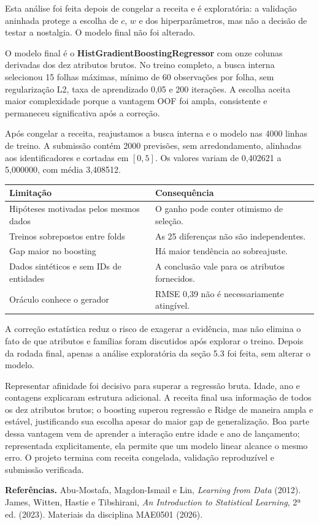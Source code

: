 \documentclass[10pt,a4paper]{article}
\newcommand{\secao}[1]{\vspace{5pt}\noindent{\large\bfseries #1}\par\vspace{2pt}}
\begin{document}
{\small Esta análise foi feita depois de congelar a receita e é exploratória: a validação aninhada protege a escolha de $c$, $w$ e dos hiperparâmetros, mas não a decisão de testar a nostalgia. O modelo final não foi alterado.}

\secao{6. Modelo final e submissão}
O modelo final é o \textbf{HistGradientBoostingRegressor} com onze colunas derivadas dos dez atributos brutos. No treino completo, a busca interna selecionou 15 folhas máximas, mínimo de 60 observações por folha, sem regularização L2, taxa de aprendizado 0,05 e 200 iterações. A escolha aceita maior complexidade porque a vantagem OOF foi ampla, consistente e permaneceu significativa após a correção.

Após congelar a receita, reajustamos a busca interna e o modelo nas 4000 linhas de treino. A submissão contém 2000 previsões, sem arredondamento, alinhadas aos identificadores e cortadas em $[0,5]$. Os valores variam de 0,402621 a 5,000000, com média 3,408512.

\secao{7. Limitações}
\begin{tabularx}{\linewidth}{@{}p{5.8cm}X@{}}
\toprule
\textbf{Limitação} & \textbf{Consequência} \\
\midrule
Hipóteses motivadas pelos mesmos dados & O ganho pode conter otimismo de seleção. \\
Treinos sobrepostos entre folds & As 25 diferenças não são independentes. \\
Gap maior no boosting & Há maior tendência ao sobreajuste. \\
Dados sintéticos e sem IDs de entidades & A conclusão vale para os atributos fornecidos. \\
Oráculo conhece o gerador & RMSE 0,39 não é necessariamente atingível. \\
\bottomrule
\end{tabularx}

A correção estatística reduz o risco de exagerar a evidência, mas não elimina o fato de que atributos e famílias foram discutidos após explorar o treino. Depois da rodada final, apenas a análise exploratória da seção 5.3 foi feita, sem alterar o modelo.

\secao{8. Conclusão}
Representar afinidade foi decisivo para superar a regressão bruta. Idade, ano e contagens explicaram estrutura adicional. A receita final usa informação de todos os dez atributos brutos; o boosting superou regressão e Ridge de maneira ampla e estável, justificando sua escolha apesar do maior gap de generalização. Boa parte dessa vantagem vem de aprender a interação entre idade e ano de lançamento; representada explicitamente, ela permite que um modelo linear alcance o mesmo erro. O projeto termina com receita congelada, validação reproduzível e submissão verificada.

\vspace{4pt}
{\footnotesize\textbf{Referências.} Abu-Mostafa, Magdon-Ismail e Lin, \textit{Learning from Data} (2012). James, Witten, Hastie e Tibshirani, \textit{An Introduction to Statistical Learning}, 2ª ed. (2023). Materiais da disciplina MAE0501 (2026).}
\end{document}
